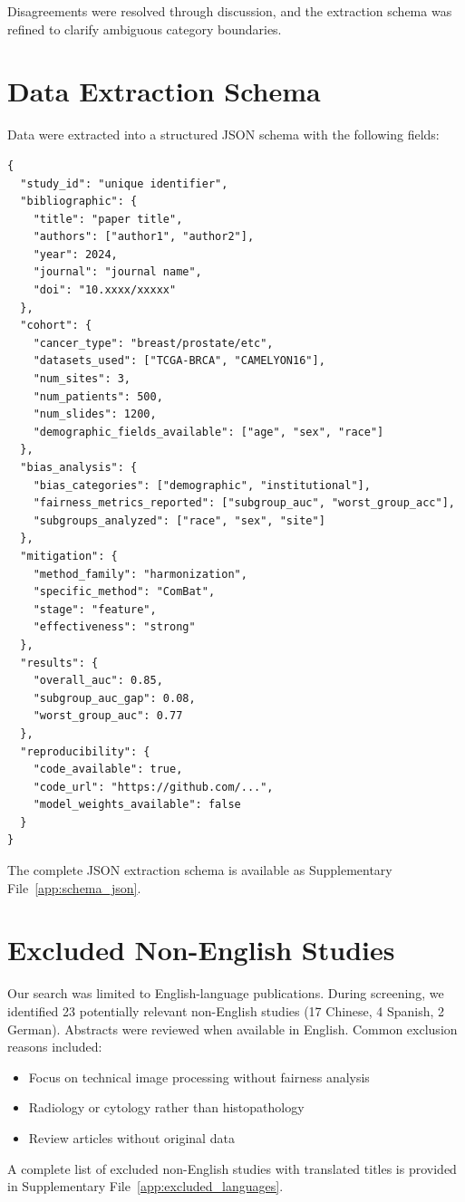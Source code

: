 Disagreements were resolved through discussion, and the extraction schema was refined to clarify ambiguous category boundaries.

\section{Data Extraction Schema}
\label{app:methods:schema}

Data were extracted into a structured JSON schema with the following fields:

\begin{verbatim}
{
  "study_id": "unique identifier",
  "bibliographic": {
    "title": "paper title",
    "authors": ["author1", "author2"],
    "year": 2024,
    "journal": "journal name",
    "doi": "10.xxxx/xxxxx"
  },
  "cohort": {
    "cancer_type": "breast/prostate/etc",
    "datasets_used": ["TCGA-BRCA", "CAMELYON16"],
    "num_sites": 3,
    "num_patients": 500,
    "num_slides": 1200,
    "demographic_fields_available": ["age", "sex", "race"]
  },
  "bias_analysis": {
    "bias_categories": ["demographic", "institutional"],
    "fairness_metrics_reported": ["subgroup_auc", "worst_group_acc"],
    "subgroups_analyzed": ["race", "sex", "site"]
  },
  "mitigation": {
    "method_family": "harmonization",
    "specific_method": "ComBat",
    "stage": "feature",
    "effectiveness": "strong"
  },
  "results": {
    "overall_auc": 0.85,
    "subgroup_auc_gap": 0.08,
    "worst_group_auc": 0.77
  },
  "reproducibility": {
    "code_available": true,
    "code_url": "https://github.com/...",
    "model_weights_available": false
  }
}
\end{verbatim}

The complete JSON extraction schema is available as Supplementary File~\ref{app:schema_json}.

\section{Excluded Non-English Studies}
\label{app:methods:excluded_languages}

Our search was limited to English-language publications. During screening, we identified 23 potentially relevant non-English studies (17 Chinese, 4 Spanish, 2 German). Abstracts were reviewed when available in English. Common exclusion reasons included:

\begin{itemize}
  \item Focus on technical image processing without fairness analysis
  \item Radiology or cytology rather than histopathology
  \item Review articles without original data
\end{itemize}

A complete list of excluded non-English studies with translated titles is provided in Supplementary File~\ref{app:excluded_languages}.
